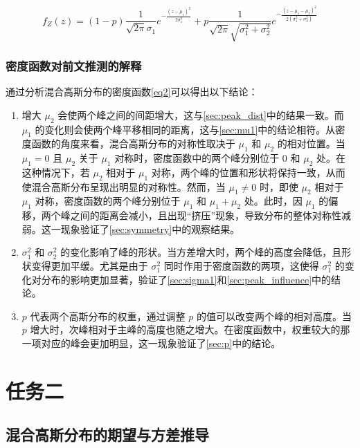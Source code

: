 \documentclass{article}
\begin{document}
\begin{equation}
f_Z(z) = (1 - p) \frac{1}{\sqrt{2\pi} \sigma_1} e^{-\frac{(z - \mu_1)^2}{2 \sigma_1^2}} + p \frac{1}{\sqrt{2\pi} \sqrt{\sigma_1^2 + \sigma_2^2}} e^{-\frac{(z - \mu_1 - \mu_2)^2}{2 (\sigma_1^2 + \sigma_2^2)}}
\label{eq2}
\end{equation}

\subsubsection{密度函数对前文推测的解释}

通过分析混合高斯分布的密度函数\ref{eq2}可以得出以下结论：

\begin{enumerate}
  \item 增大 \( \mu_2 \) 会使两个峰之间的间距增大，这与\ref{sec:peak_dist}中的结果一致。而 \( \mu_1 \) 的变化则会使两个峰平移相同的距离，这与\ref{sec:mu1}中的结论相符。从密度函数的角度来看，混合高斯分布的对称性取决于 \( \mu_1 \) 和 \( \mu_2 \) 的相对位置。当 \( \mu_1 = 0 \) 且 \( \mu_2 \) 关于 \( \mu_1 \) 对称时，密度函数中的两个峰分别位于 0 和 \( \mu_2 \) 处。在这种情况下，若 \( \mu_2 \) 相对于 \( \mu_1 \) 对称，两个峰的位置和形状将保持一致，从而使混合高斯分布呈现出明显的对称性。然而，当 \( \mu_1 \neq 0 \) 时，即使 \( \mu_2 \) 相对于 \( \mu_1 \) 对称，密度函数的两个峰分别位于 \( \mu_1 \) 和 \( \mu_1 + \mu_2 \) 处。此时，因 \( \mu_1 \) 的偏移，两个峰之间的距离会减小，且出现“挤压”现象，导致分布的整体对称性减弱。这一现象验证了\ref{sec:symmetry}中的观察结果。
  \item \( \sigma_1^2 \) 和 \( \sigma_2^2 \) 的变化影响了峰的形状。当方差增大时，两个峰的高度会降低，且形状变得更加平缓。尤其是由于 \( \sigma_1^2 \) 同时作用于密度函数的两项，这使得 \( \sigma_1^2 \) 的变化对分布的影响更加显著，验证了\ref{sec:sigma1}和\ref{sec:peak_influence}中的结论。
  \item \( p \) 代表两个高斯分布的权重，通过调整 \( p \) 的值可以改变两个峰的相对高度。当 \( p \) 增大时，次峰相对于主峰的高度也随之增大。在密度函数中，权重较大的那一项对应的峰会更加明显，这一现象验证了\ref{sec:p}中的结论。
\end{enumerate}

\section{任务二}

\subsection{混合高斯分布的期望与方差推导}
\end{document}

